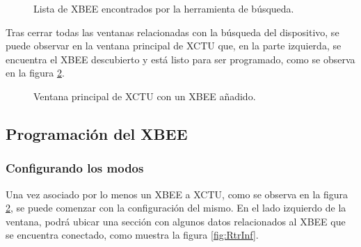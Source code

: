 \begin{figure}[H] %
\caption{Lista de XBEE encontrados por la herramienta de búsqueda.}
\label{fig:DvF}
\end{figure}

Tras cerrar todas las ventanas relacionadas con la búsqueda del dispositivo, se puede observar en la ventana principal de XCTU que, en la parte izquierda, se encuentra el XBEE descubierto y está listo para ser programado, como se observa en la figura \ref{fig:XCTM}.

\begin{figure}[H] %
\caption{Ventana principal de XCTU con un XBEE añadido.}
\label{fig:XCTM}
\end{figure}

\subsection{Programación del XBEE}
\subsubsection{Configurando los modos}\label{StartConf}
Una vez asociado por lo menos un XBEE a XCTU, como se observa en la figura \ref{fig:XCTM}, se puede comenzar con la configuración del mismo. En el lado izquierdo de la ventana, podrá ubicar una sección con algunos datos relacionados al XBEE que se encuentra conectado, como muestra la figura \ref{fig:RtrInf}. 

